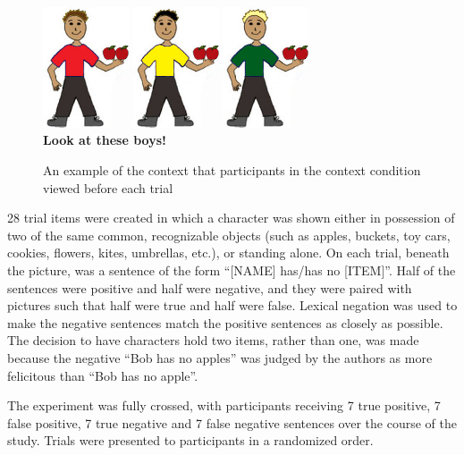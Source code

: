 \documentclass[man]{apa2}
\begin{document}
\begin{figure}
\begin{center} 
\includegraphics[width=1in]{figures/apples_context1_item.jpg}
\includegraphics[width=1in]{figures/apples_context2_item.jpg}
\includegraphics[width=1in]{figures/apples_context3_item.jpg}
\\ {\bf Look at these boys!}
\caption{\label{fig:addition_subs} An example of the context that participants in the context condition viewed before each trial}
\end{center} 
\end{figure}

28 trial items were created in which a character was shown either in possession of two of the same common, recognizable objects (such as apples, buckets, toy cars, cookies, flowers, kites, umbrellas, etc.), or standing alone.  On each trial, beneath the picture, was a sentence of the form ``[NAME] has/has no [ITEM]''.  Half of the sentences were positive and half were negative, and they were paired with pictures such that half were true and half were false.  Lexical negation was used to make the negative sentences match the positive sentences as closely as possible.  The decision to have characters hold two items, rather than one, was made because the negative ``Bob has no apples'' was judged by the authors as more felicitous than ``Bob has no apple''.  

The experiment was fully crossed, with participants receiving 7 true positive, 7 false positive, 7 true negative and 7 false negative sentences over the course of the study.  Trials were presented to participants in a randomized order.
\end{document}
